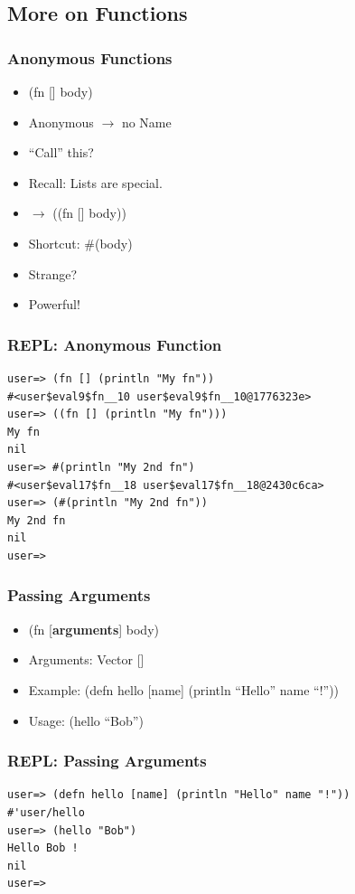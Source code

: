 \documentclass{beamer}
\begin{document}
\subsection{More on Functions}

  \begin{frame}
      \frametitle{Anonymous Functions}

      \begin{itemize}
          \item (fn [] body)
          \item Anonymous $\rightarrow$ no Name
          \item ``Call'' this?
          \item Recall: Lists are special.
          \item $\rightarrow$ ((fn [] body))
          \item Shortcut: \#(body)
          \item Strange?
          \item Powerful!
      \end{itemize}
  \end{frame}

\begin{frame}[fragile]
\frametitle{REPL: Anonymous Function}
\begin{lstlisting}[basicstyle=\scriptsize]
user=> (fn [] (println "My fn"))
#<user$eval9$fn__10 user$eval9$fn__10@1776323e>
user=> ((fn [] (println "My fn")))
My fn
nil
user=> #(println "My 2nd fn")
#<user$eval17$fn__18 user$eval17$fn__18@2430c6ca>
user=> (#(println "My 2nd fn"))
My 2nd fn
nil
user=>  
\end{lstlisting}
\end{frame}

  \begin{frame}
      \frametitle{Passing Arguments}

      \begin{itemize}
          \item (fn [\textbf{arguments}] body)
          \item Arguments: Vector []
          \item Example: (defn hello [name] (println ``Hello'' name ``!''))
          \item Usage: (hello ``Bob'')
      \end{itemize}
  \end{frame}

\begin{frame}[fragile]
\frametitle{REPL: Passing Arguments}
\begin{lstlisting}[basicstyle=\scriptsize]
user=> (defn hello [name] (println "Hello" name "!"))
#'user/hello
user=> (hello "Bob")
Hello Bob !
nil
user=>  
\end{lstlisting}
\end{frame}
\end{document}
